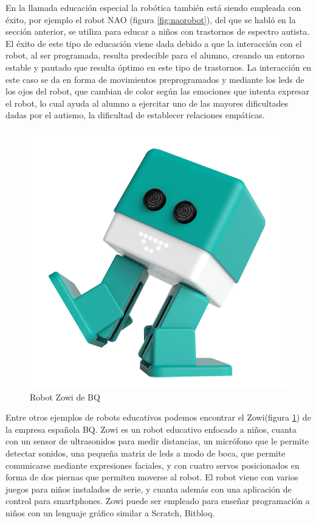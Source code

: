 En la llamada educación especial la robótica también está siendo empleada con éxito, por ejemplo el robot NAO (figura \ref{fig:naorobot}), del que se habló en la sección anterior, se utiliza para educar a niños con trastornos de espectro autista. El éxito de este tipo de educación viene dada debido a que la interacción con el robot, al ser programada, resulta predecible para el alumno, creando un entorno estable y pautado que resulta óptimo en este tipo de trastornos. La interacción en este caso se da en forma de movimientos preprogramados y mediante los leds de los ojos del robot, que cambian de color según las emociones que intenta expresar el robot, lo cual ayuda al alumno a ejercitar uno de las mayores dificultades dadas por el autismo, la dificultad de establecer relaciones empáticas.
 

 
   \begin{figure}
	\centering
	\includegraphics[width=0.6\linewidth]{imagenes/zowi.png}
	\caption{Robot Zowi de BQ}
	\label{fig:zowi}
\end{figure} 

 Entre otros ejemplos de robots educativos podemos encontrar el Zowi(figura \ref{fig:zowi}) de la empresa española BQ. Zowi es un robot educativo enfocado a niños, cuanta con un sensor de ultrasonidos para medir distancias, un micrófono que le permite detectar sonidos, una pequeña matriz de leds a modo de boca, que permite comunicarse mediante expresiones faciales, y con cuatro servos posicionados en forma de dos piernas que permiten moverse al robot.
 El robot viene con varios juegos para niños instalados de serie, y cuanta además con una aplicación de control para smartphones. Zowi puede ser empleado para enseñar programación a niños con un lenguaje gráfico similar a Scratch\cite{scratch}, Bitbloq\cite{bitbloq}.
 
